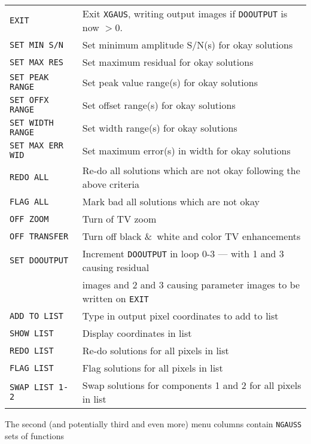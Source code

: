 \documentclass[twoside]{article}
\begin{document}
\begin{center}
\begin{tabular}{|l|l|}\hline
 {\tt EXIT           } & Exit {\tt XGAUS}, writing output images if
                         {\tt DOOUTPUT} is now $> 0.$\\
 {\tt SET MIN S/N    } & Set minimum amplitude S/N(s) for okay
                         solutions\\
 {\tt SET MAX RES    } & Set maximum residual for okay solutions\\
 {\tt SET PEAK RANGE } & Set peak value range(s) for okay solutions\\
 {\tt SET OFFX RANGE } & Set offset range(s) for okay solutions\\
 {\tt SET WIDTH RANGE} & Set width range(s) for okay solutions\\
 {\tt SET MAX ERR WID} & Set maximum error(s) in width for okay
                         solutions\\
 {\tt REDO ALL       } & Re-do all solutions which are not okay
                         following the above criteria\\
 {\tt FLAG ALL       } & Mark bad all solutions which are not okay\\
 {\tt OFF ZOOM       } & Turn of TV zoom\\
 {\tt OFF TRANSFER   } & Turn off black \&\ white and color TV
                         enhancements\\
 {\tt SET DOOUTPUT   } & Increment {\tt DOOUTPUT} in loop 0-3 --- with
                         1 and 3 causing residual\\
                       & images and 2 and 3 causing parameter images
                         to be written on {\tt EXIT}\\
 {\tt ADD TO LIST    } & Type in output pixel coordinates to add to
                         list\\
 {\tt SHOW LIST      } & Display coordinates in list\\
 {\tt REDO LIST      } & Re-do solutions for all pixels in list\\
 {\tt FLAG LIST      } & Flag solutions for all pixels in list\\
 {\tt SWAP LIST 1-2  } & Swap solutions for components 1 and 2 for all
                         pixels in list\\ \hline
\end{tabular}
\end{center}

The second (and potentially third and even more) menu columns
contain {\tt NGAUSS} sets of functions
\end{document}
